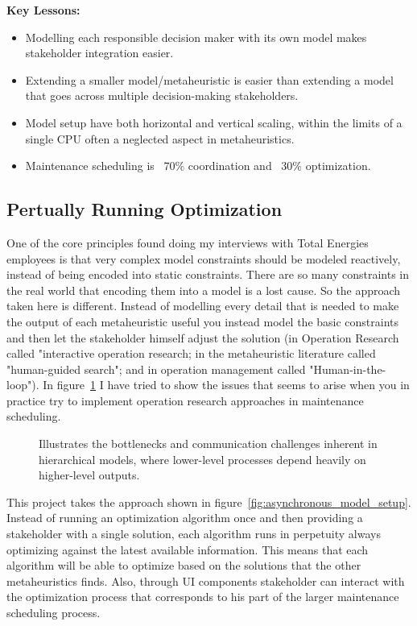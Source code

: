 \textbf{Key Lessons:}
\begin{itemize}
	\item Modelling each responsible decision maker with its own model makes stakeholder integration easier.
	\item Extending a smaller model/metaheuristic is easier than extending a model that goes across multiple decision-making stakeholders.
	\item Model setup have both horizontal and vertical scaling, within the limits of a single CPU often a neglected aspect in metaheuristics. 
	\item Maintenance scheduling is ~70\% coordination and ~30\% optimization.
\end{itemize}

\subsection*{Pertually Running Optimization}
One of the core principles found doing my interviews with Total Energies employees is that very complex model constraints should be modeled reactively, instead 
of being encoded into static constraints. There are so many constraints in the real world that 
encoding them into a model is a lost cause. So the approach taken here is different. Instead of modelling every
detail that is needed to make the output of each metaheuristic useful you instead model the basic constraints and then let 
the stakeholder himself adjust the solution (in Operation Research called "interactive operation research; in the metaheuristic literature called
"human-guided search"; and in operation management called "Human-in-the-loop"). In figure~\ref{fig:model-setup:classic-hierarchical}
I have tried to show the issues that seems to arise when you in practice try to implement operation research approaches in maintenance scheduling. \citep{meignan_review_2015}

\begin{figure}[H]
	\centering
	
	\caption{
		Illustrates the bottlenecks and communication challenges inherent in hierarchical models, where lower-level processes depend heavily on higher-level outputs.
	}
	\label{fig:model-setup:classic-hierarchical}
\end{figure}

This project takes the approach shown in figure~\ref{fig:asynchronous_model_setup}. 
Instead of running an optimization algorithm once and then providing a stakeholder with a single 
solution, each algorithm runs in perpetuity always optimizing against the latest available information. This means that each algorithm will
be able to optimize based on the solutions that the other metaheuristics finds. Also, through UI components stakeholder can interact with the
optimization process that corresponds to his part of the larger maintenance scheduling process. 

